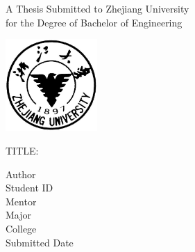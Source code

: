 \thispagestyle{empty}

{
\setlength{\parindent}{0em}
\renewcommand{\baselinestretch}{2}

\vspace*{6mm}

{
\renewcommand{\baselinestretch}{1}
\songti\xiaoer

\hspace{2em}A Thesis Submitted to Zhejiang University\\
  \hspace{4em}for the Degree of Bachelor of Engineering



}

\vspace{1.5em}

\begin{center}
  \includegraphics[width=35mm]{data/cover/xiaobiao}
\end{center}

\vspace{2em}

{
\renewcommand{\baselinestretch}{2}
\songti\xiaoer
\centering
\hspace*{-0.5em}TITLE: \; \underline{\makebox[16em]{\zjutitlee}}\hspace*{-0.5em} \\
\vspace{2em}
\sanhao
\begin{flushleft}
\hspace{2em}Author\; \underline{\makebox[18em]{\zjuauthornamee}} \\
\hspace{2em}Student ID \; \underline{\makebox[16em]{\zjuauthorid}} \\
\hspace{2em}Mentor \; \underline{\makebox[18em]{\zjumentore}} \\
\hspace{2em}Major \; \underline{\makebox[20em]{\zjumajore}} \\
\hspace{2em}College \; \underline{\makebox[19em]{\zjucollegee}} \\
\hspace{2em}Submitted Date \; \underline{\makebox[14em]{\zjudatee}} \par
\end{flushleft}

}
}
